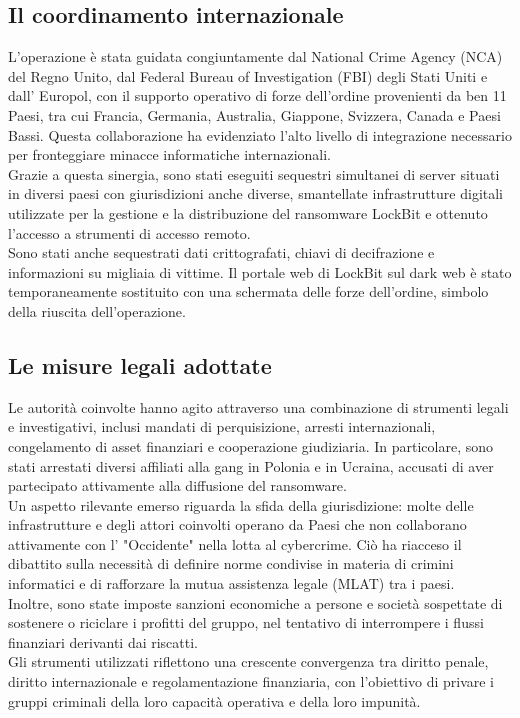 \documentclass[a4paper,12pt,twoside]{article}
\begin{document}
\subsection{Il coordinamento internazionale}
L'operazione è stata guidata congiuntamente dal National Crime Agency (NCA) del Regno Unito, dal Federal Bureau of Investigation (FBI) degli Stati Uniti e dall' Europol, con il supporto operativo di forze dell'ordine provenienti da ben 11 Paesi, tra cui Francia, Germania, Australia, Giappone, Svizzera, Canada e Paesi Bassi. Questa collaborazione ha evidenziato l'alto livello di integrazione necessario per fronteggiare minacce informatiche internazionali.\\
Grazie a questa sinergia, sono stati eseguiti sequestri simultanei di server situati in diversi paesi con giurisdizioni anche diverse, smantellate infrastrutture digitali utilizzate per la gestione e la distribuzione del ransomware LockBit e ottenuto l'accesso a strumenti di accesso remoto. \\
Sono stati anche sequestrati dati crittografati, chiavi di decifrazione e informazioni su migliaia di vittime. Il portale web di LockBit sul dark web è stato temporaneamente sostituito con una schermata delle forze dell'ordine, simbolo della riuscita dell'operazione.

\subsection{Le misure legali adottate}
Le autorità coinvolte hanno agito attraverso una combinazione di strumenti legali e investigativi, inclusi mandati di perquisizione, arresti internazionali, congelamento di asset finanziari e cooperazione giudiziaria. In particolare, sono stati arrestati diversi affiliati alla gang in Polonia e in Ucraina, accusati di aver partecipato attivamente alla diffusione del ransomware.\\
Un aspetto rilevante emerso riguarda la sfida della giurisdizione: molte delle infrastrutture e degli attori coinvolti operano da Paesi che non collaborano attivamente con l' "Occidente" nella lotta al cybercrime. Ciò ha riacceso il dibattito sulla necessità di definire norme condivise in materia di crimini informatici e di rafforzare la mutua assistenza legale (MLAT) tra i paesi.\\
Inoltre, sono state imposte sanzioni economiche a persone e società sospettate di sostenere o riciclare i profitti del gruppo, nel tentativo di interrompere i flussi finanziari derivanti dai riscatti.\\
Gli strumenti utilizzati riflettono una crescente convergenza tra diritto penale, diritto internazionale e regolamentazione finanziaria, con l'obiettivo di privare i gruppi criminali della loro capacità operativa e della loro impunità.
\end{document}
